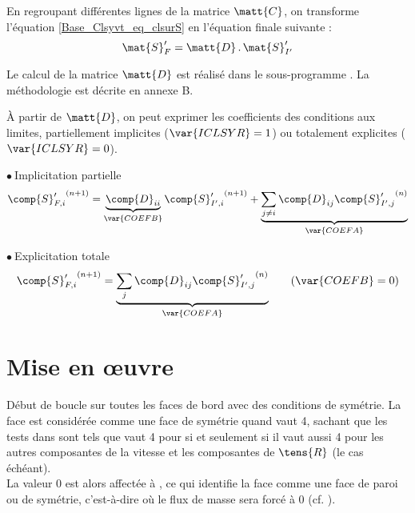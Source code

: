 En regroupant diff\'erentes lignes de la matrice $\matt{C}$, on transforme
l'\'equation \ref{Base_Clsyvt_eq_clsurS} en l'\'equation finale suivante :
\begin{equation}
\mat{S}_F^\prime=\matt{D}\,.\,\mat{S}_{I'}^\prime
\end{equation}

Le calcul de la matrice $\matt{D}$ est r\'ealis\'e dans le sous-programme
. La m\'ethodologie est d\'ecrite en annexe B.

\`A partir de $\matt{D}$, on peut exprimer les coefficients des conditions aux
limites, partiellement implicites ($\var{ICLSYR}=1$) ou totalement explicites
($\var{ICLSYR}=0$).

$\bullet\ ${\sc Implicitation partielle}\\
\begin{equation}
\label{Base_Clsyvt_eq_clRimp}
{\comp{S}_{F,i}^\prime}^{(n+1)} =
\underbrace{\comp{D}_{ii}}_{\var{COEFB}}{\comp{S}_{I',i}^\prime}^{(n+1)}
+\underbrace{\sum_{j\ne i}\comp{D}_{ij}{\comp{S}_{I',j}^\prime}^{(n)}}_{\var{COEFA}}
\end{equation}

$\bullet\ ${\sc Explicitation totale}\\
\begin{equation}
\label{Base_Clsyvt_eq_clRexp}
{\comp{S}_{F,i}^\prime}^{(n+1)} =
\underbrace{\sum_j\comp{D}_{ij}{\comp{S}_{I',j}^\prime}^{(n)}}_{\var{COEFA}}
\qquad(\var{COEFB}=0)
\end{equation}

\section{Mise en \oe uvre}
\label{Base_Clsyvt_prg_meo}%
D\'ebut de boucle sur toutes les faces de bord  avec des conditions de
sym\'etrie. La face est consid\'er\'ee comme une face de sym\'etrie quand
 vaut 4, sachant que les tests dans 
sont tels que  vaut 4 pour  si et seulement si il vaut aussi
4 pour les autres composantes de la vitesse et les composantes de $\tens{R}$ (le
cas \'ech\'eant).\\
La valeur 0 est alors affect\'ee \`a , ce qui identifie la face
comme une face de paroi ou de sym\'etrie, c'est-\`a-dire o\`u le flux de masse
sera forc\'e \`a 0 (cf. ).

